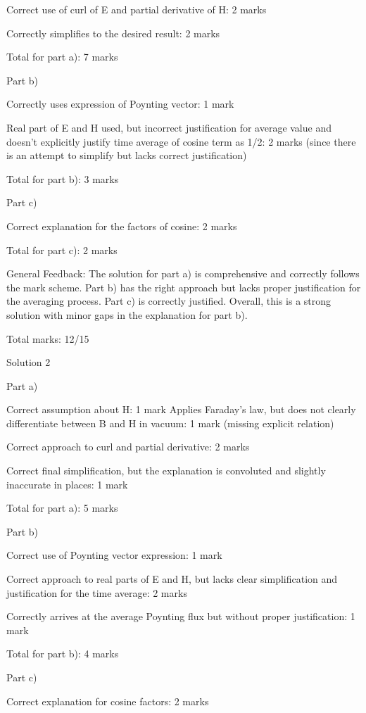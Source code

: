 \documentclass[a4paper,11pt]{article}
\begin{document}
Correct use of curl of E and partial derivative of H: 2 marks

Correctly simplifies to the desired result: 2 marks

Total for part a): 7 marks

Part b)

Correctly uses expression of Poynting vector: 1 mark

Real part of E and H used, but incorrect justification for average value and doesn't explicitly justify time average of cosine term as 1/2: 2 marks (since there is an attempt to simplify but lacks correct justification)

Total for part b): 3 marks

Part c)

Correct explanation for the factors of cosine: 2 marks

Total for part c): 2 marks

General Feedback: The solution for part a) is comprehensive and correctly follows the mark scheme. Part b) has the right approach but lacks proper justification for the averaging process. Part c) is correctly justified. Overall, this is a strong solution with minor gaps in the explanation for part b).

Total marks: 12/15

Solution 2

Part a)

Correct assumption about H: 1 mark
Applies Faraday's law, but does not clearly differentiate between B and H in vacuum: 1 mark (missing explicit relation)

Correct approach to curl and partial derivative: 2 marks

Correct final simplification, but the explanation is convoluted and slightly inaccurate in places: 1 mark

Total for part a): 5 marks

Part b)

Correct use of Poynting vector expression: 1 mark

Correct approach to real parts of E and H, but lacks clear simplification and justification for the time average: 2 marks

Correctly arrives at the average Poynting flux but without proper justification: 1 mark

Total for part b): 4 marks

Part c)

Correct explanation for cosine factors: 2 marks
\end{document}
